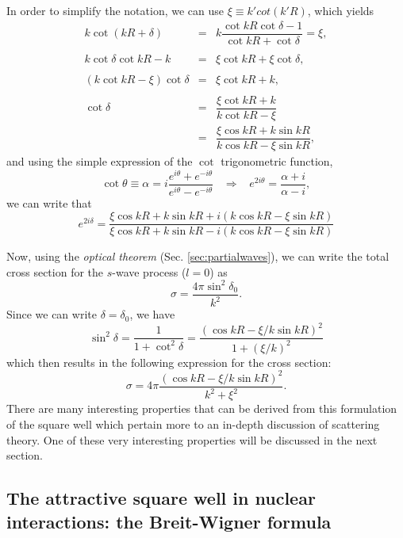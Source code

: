 In order to simplify the notation, we can use $ \xi \equiv k'cot (k'R) $, which yields
\begin{eqnarray}
  k \cot (kR + \delta) & = & k \dfrac{\cot kR \cot \delta -1}{\cot kR + \cot \delta} = \xi, \nonumber \\ \nonumber \\
  k \cot \delta \cot kR -k & = & \xi \cot kR + \xi \cot \delta,  \nonumber \\ \nonumber \\ 
  (k \cot kR - \xi)  \cot \delta & = & \xi \cot kR + k,  \nonumber \\ \nonumber \\ 
  \cot \delta & = & \dfrac{\xi \cot kR + k}{k \cot kR - \xi}  \nonumber \\
  & = & \dfrac{\xi \cos kR + k \sin kR}{k \cos kR - \xi \sin kR},    
\end{eqnarray}
and using the simple expression of the $\cot$ trigonometric function,
\[ \cot \theta \equiv \alpha = i \dfrac{e^{i\theta} + e^{-i\theta}}{e^{i\theta} - e^{-i\theta}} \; \; \; \Rightarrow \; \; \; e^{2i\theta} = \dfrac{\alpha + i}{\alpha -i}, \]
we can write that
\begin{equation}
\label{eq:Smatrix}
e^{2i\delta} = \dfrac{\xi \cos kR + k \sin kR + i (k \cos kR - \xi \sin kR)}{\xi \cos kR + k \sin kR -i (k \cos kR - \xi \sin kR)}
\end{equation}

Now, using the \emph{optical theorem} (Sec. \ref{sec:partialwaves}), we can write the total cross section for the $s$-wave process (\(l=0\)) as
\begin{equation}
\label{eq:XS-well-1}
\sigma = \dfrac{4 \pi \sin^2 \delta_0}{k^2}.
\end{equation}
Since we can write $\delta = \delta_0$, we have
\[ \sin^2 \delta = \dfrac{1}{1+\cot^2 \delta} = \dfrac{(\cos kR - \xi/k \sin kR )^2}{1 + (\xi/k)^2} \]
which then results in the following expression for the cross section:
\begin{equation}
\label{eq:XS-well-2}
\sigma = 4\pi \dfrac{(\cos kR - \xi/k \sin kR)^2}{k^2 + \xi^2}.
\end{equation}
There are many interesting properties that can be derived from this formulation of the square well which pertain more to an in-depth discussion of scattering theory. One of these very interesting properties will be discussed in the next section.

\subsection{The attractive square well in nuclear interactions: the Breit-Wigner formula}


